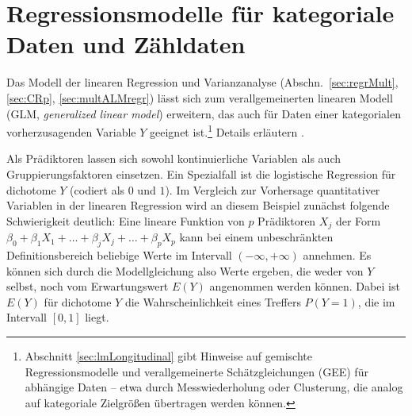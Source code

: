 \chapter{Regressionsmodelle für kategoriale Daten und Zähldaten}
\label{sec:glm}

Das Modell der linearen Regression und Varianzanalyse (Abschn.\ \ref{sec:regrMult}, \ref{sec:CRp}, \ref{sec:multALMregr}) lässt sich zum verallgemeinerten linearen Modell (GLM, \emph{generalized linear model}) erweitern, das auch für Daten einer kategorialen vorherzusagenden Variable $Y$ geeignet ist.\footnote{Abschnitt \ref{sec:lmLongitudinal} gibt Hinweise auf gemischte Regressionsmodelle und verallgemeinerte Schätzgleichungen (GEE) für abhängige Daten -- etwa durch Messwiederholung oder Clusterung, die analog auf kategoriale Zielgrößen übertragen werden können.} Details erläutern .

Als Prädiktoren lassen sich sowohl kontinuierliche Variablen als auch Gruppierungsfaktoren einsetzen. Ein Spezialfall ist die logistische Regression für dichotome $Y$ (codiert als $0$ und $1$). Im Vergleich zur Vorhersage quantitativer Variablen in der linearen Regression wird an diesem Beispiel zunächst folgende Schwierigkeit deutlich: Eine lineare Funktion von $p$ Prädiktoren $X_{j}$ der Form $\beta_{0} + \beta_{1} X_{1} + \dots + \beta_{j} X_{j} + \dots + \beta_{p} X_{p}$ kann bei einem unbeschränkten Definitionsbereich beliebige Werte im Intervall $(-{\infty}, +{\infty})$ annehmen. Es können sich durch die Modellgleichung also Werte ergeben, die weder von $Y$ selbst, noch vom Erwartungswert $E(Y)$ angenommen werden können. Dabei ist $E(Y)$ für dichotome $Y$ die Wahrscheinlichkeit eines Treffers $P(Y = 1)$, die im Intervall $[0, 1]$ liegt.

